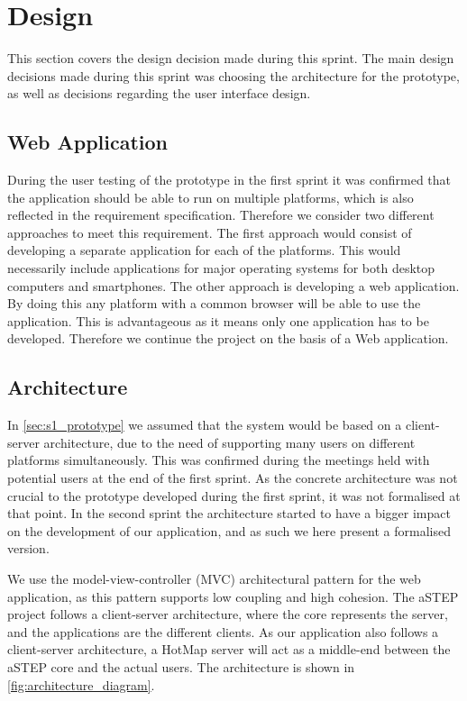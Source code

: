 \section{Design} \label{sec:s2_design}
This section covers the design decision made during this sprint. The main design decisions made during this sprint was choosing the architecture for the prototype, as well as decisions regarding the user interface design.

\subsection{Web Application}
During the user testing of the prototype in the first sprint it was confirmed that the application should be able to run on multiple platforms, which is also reflected in the requirement specification. Therefore we consider two different approaches to meet this requirement. The first approach would consist of developing a separate application for each of the platforms. This would necessarily include applications for major operating systems for both desktop computers and smartphones. The other approach is developing a web application. By doing this any platform with a common browser will be able to use the application. This is advantageous as it means only one application has to be developed. Therefore we continue the project on the basis of a Web application. 

\subsection{Architecture} \label{sec:s2_architecture}
In \cref{sec:s1_prototype} we assumed that the system would be based on a client-server architecture, due to the need of supporting many users on different platforms simultaneously. This was confirmed during the meetings held with potential users at the end of the first sprint. As the concrete architecture was not crucial to the prototype developed during the first sprint, it was not formalised at that point. In the second sprint the architecture started to have a bigger impact on the development of our application, and as such we here present a formalised version.

We use the model-view-controller (MVC)\cite{} architectural pattern for the web application, as this pattern supports low coupling and high cohesion. The aSTEP project follows a client-server architecture, where the core represents the server, and the applications are the different clients. As our application also follows a client-server architecture, a HotMap server will act as a middle-end between the aSTEP core and the actual users. The architecture is shown in \cref{fig:architecture_diagram}.

